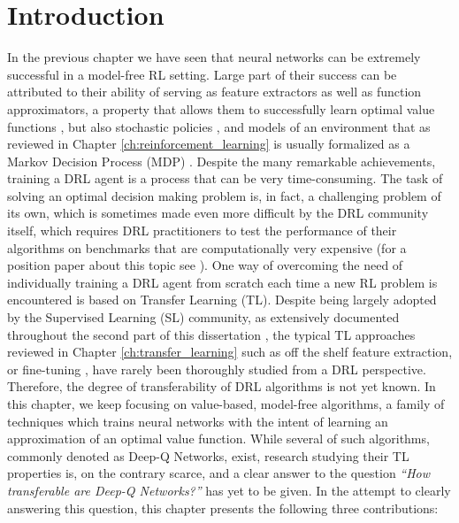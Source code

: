 \section{Introduction}
\label{sec:intro}

In the previous chapter we have seen that neural networks can be extremely successful in a model-free RL setting. Large part of their success can be attributed to their ability of serving as feature extractors as well as function approximators, a property that allows them to successfully learn optimal value functions \citep{mnih2013playing,mnih2015human,van2016deep,zhao2016deep,wang2016dueling,sabatelli2020deep}, but also stochastic policies \citep{lillicrap2015continuous,schulman2015high,schulman2015trust,wang2016sample,mnih2016asynchronous,schulman2017proximal,haarnoja2018soft,fujimoto2018addressing}, and models of an environment \citep{ha2018world,kaiser2019model,hafner2019dream,hafner2019learning,hafner2020mastering} that as reviewed in Chapter \ref{ch:reinforcement_learning} is usually formalized as a Markov Decision Process (MDP) %
\cite{puterman1990markov}. Despite the many remarkable achievements, training a DRL agent is a process that can be very time-consuming. The task of solving an optimal decision making problem is,  in fact, a challenging problem of its own, which is sometimes made even more difficult by the DRL community itself, which requires DRL practitioners to test the performance of their algorithms on benchmarks that are computationally very expensive (for a position paper about this topic see \citep{obando2020revisiting}). One way of overcoming the need of individually training a DRL agent from scratch each time a new RL problem is encountered is based on Transfer Learning (TL). 
Despite being largely adopted by the Supervised Learning (SL) community, as extensively documented throughout the second part of this dissertation \citep{huh2016makes,mormont2018comparison,sabatelli2018deep,dominguez2019transfer,vandaele2021deep,ho2021evaluation}, the typical TL approaches reviewed in Chapter \ref{ch:transfer_learning} such as off the shelf feature extraction, or fine-tuning \citep{sharif2014cnn}, have rarely been thoroughly studied from a DRL perspective. Therefore, the degree of transferability of DRL algorithms is not yet known. In this chapter, we keep focusing on value-based, model-free algorithms, a family of techniques which trains neural networks with the intent of learning an approximation of an optimal value function. While several of such algorithms, commonly denoted as Deep-Q Networks, exist, research studying their TL properties is, on the contrary scarce, and a clear answer to the question \textit{``How transferable are Deep-Q Networks?''} has yet to be given. In the attempt to clearly answering this question, this chapter presents the following three contributions:
